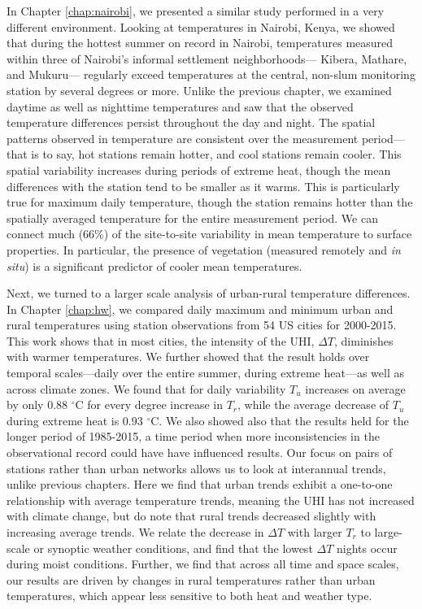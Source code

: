 In Chapter \ref{chap:nairobi}, we presented a similar study performed in a very different environment. Looking at temperatures in Nairobi, Kenya, we showed that 
during the hottest summer on record in Nairobi, temperatures measured within three of Nairobi's informal settlement neighborhoods--- Kibera, Mathare, and Mukuru--- regularly exceed temperatures at the central, non-slum monitoring station by several degrees or more. Unlike the previous chapter, we examined daytime as well as nighttime temperatures and saw that the observed temperature differences persist throughout the day and night.  The spatial patterns observed in temperature are consistent over the measurement period---that is to say, hot stations remain hotter, and cool stations remain cooler. This spatial variability increases during periods of extreme heat, though the mean differences with the station tend to be smaller as it warms. This is particularly true for maximum daily temperature, though the station remains hotter than the spatially averaged temperature for the entire measurement period. We can connect much (66\%) of the site-to-site variability in mean temperature to surface properties. In particular, the presence of vegetation (measured remotely and \textit{in situ}) is a significant predictor of cooler mean temperatures.

Next, we turned to a larger scale analysis of urban-rural temperature differences. In Chapter \ref{chap:hw}, we compared daily maximum and minimum urban and rural temperatures using station observations from 54 US cities for 2000-2015. This work shows that in most cities, the intensity of the UHI, $\Delta T$, diminishes with warmer temperatures.  We further showed that the result holds over temporal scales---daily over the entire summer, during extreme heat---as well as across climate zones. We found that for daily variability $T_u$ increases on average by only 0.88 $^\circ$C for every degree increase in $T_r$, while the average decrease of $T_u$ during extreme heat is 0.93 $^\circ$C. %
We also showed also that the results held for the longer period of 1985-2015, a time period when more inconsistencies in the observational record could have have influenced results.
Our focus on pairs of stations rather than urban networks allows us to look at interannual trends, unlike previous chapters. Here we find that urban trends exhibit a one-to-one relationship with average temperature trends, meaning the UHI has not increased with climate change, but do note that rural trends decreased slightly with increasing average trends. We relate the decrease in $\Delta T$ with larger $T_r$ to large-scale or synoptic weather conditions, and find that the lowest $\Delta T$ nights occur during moist conditions. Further, we find that across all time and space scales, our results are driven by changes in rural temperatures rather than urban temperatures, which appear less sensitive to both heat and weather type. 

